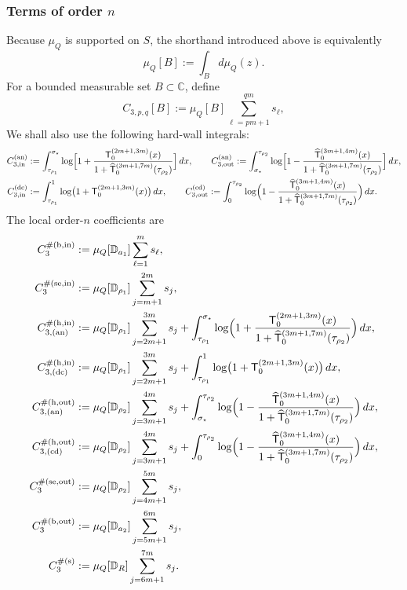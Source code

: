 \documentclass[a4paper]{article}
\newcommand{\C}{\mathbb{C}}
\numberwithin{equation}{section}
\begin{document}
\subsubsection{Terms of order \texorpdfstring{$n$}{n}}
Because $\mu_Q$ is supported on $S$, the shorthand introduced above is
equivalently
\begin{equation}
 \mu_{Q}[B]:=\int_{B}d\mu_{Q}(z).   
\end{equation}
For a bounded measurable set $B\subset\C$, define
\begin{equation}
C_{3,p,q}[B]:=\mu_Q[B]\sum_{\ell=pm+1}^{qm}s_{\ell},    
\end{equation}
We shall also use the following hard-wall integrals:
\begin{align}
C_{3,\mathrm{in}}^{(\mathrm{an})}&:=\int_{\tau_{\rho_1}}^{\sigma_{\star}}\log\Bigl[1+\frac{\mathsf{T}_{0}^{(2m+1,3m)}(x)}{1+\widehat{\mathsf{T}}_0^{(3m+1,7m)}(\tau_{\rho_2})}\Bigr]\,dx,\qquad    
C_{3,\mathrm{out}}^{(\mathrm{an})}:=\int_{\sigma_{\star}}^{\tau_{\rho_2}}
\log\Bigl[1-\frac{\widehat{\mathsf{T}}_0^{(3m+1,4m)}(x)}{1+\widehat{\mathsf{T}}_0^{(3m+1,7m)}(\tau_{\rho_2})}\Bigr]\,dx,
\\
C_{3,\mathrm{in}}^{(\mathrm{dc})}&:=
\int_{\tau_{\rho_1}}^1
\log\bigl(1+\mathsf{T}_{0}^{(2m+1,3m)}(x)\bigr)\,dx,
\qquad
C_{3,\mathrm{out}}^{(\mathrm{cd})}:=\int_{0}^{\tau_{\rho_2}}
\log\Bigl(1-\frac{\widehat{\mathsf{T}}_0^{(3m+1,4m)}(x)}{1+\widehat{\mathsf{T}}_0^{(3m+1,7m)}(\tau_{\rho_2})}\Bigr)\,dx.
\end{align}
The local order-$n$ coefficients are
\begin{align}
C_3^{\#(\mathrm{b,in})}
&:=\mu_Q[\mathbb{D}_{a_1}]\sum_{\ell=1}^m s_{\ell},
\\
C_{3}^{\#(\mathrm{se,in})}
&:=
\mu_Q[\mathbb{D}_{\rho_1}]\sum_{j=m+1}^{2m}s_j,
\\
C_{3,(\mathrm{an})}^{\#(\mathrm{h,in})}
&:=
\mu_Q[\mathbb{D}_{\rho_1}]\sum_{j=2m+1}^{3m}s_j
+\int_{\tau_{\rho_1}}^{\sigma_{\star}}
\log\Bigl(1+\frac{\mathsf{T}_{0}^{(2m+1,3m)}(x)}{1+\widehat{\mathsf{T}}_0^{(3m+1,7m)}(\tau_{\rho_2})}\Bigr)\,dx,
\\
C_{3,(\mathrm{dc})}^{\#(\mathrm{h,in})}
&:=
\mu_Q[\mathbb{D}_{\rho_1}]\sum_{j=2m+1}^{3m}s_j
+
\int_{\tau_{\rho_1}}^1
\log\bigl(1+\mathsf{T}_{0}^{(2m+1,3m)}(x)\bigr)\,dx, 
\\
C_{3,(\mathrm{an})}^{\#(\mathrm{h,out})}
&:=
\mu_Q[\mathbb{D}_{\rho_2}]\sum_{j=3m+1}^{4m}s_j
+
\int_{\sigma_{\star}}^{\tau_{\rho_2}}
\log\Bigl(1-\frac{\widehat{\mathsf{T}}_0^{(3m+1,4m)}(x)}{1+\widehat{\mathsf{T}}_0^{(3m+1,7m)}(\tau_{\rho_2})}\Bigr)\,dx,
\\
C_{3,(\mathrm{cd})}^{\#(\mathrm{h,out})}
&:=
\mu_Q[\mathbb{D}_{\rho_2}]\sum_{j=3m+1}^{4m}s_j
+
\int_{0}^{\tau_{\rho_2}}
\log\Bigl(1-\frac{\widehat{\mathsf{T}}_0^{(3m+1,4m)}(x)}{1+\widehat{\mathsf{T}}_0^{(3m+1,7m)}(\tau_{\rho_2})}\Bigr)\,dx,
\\
C_{3}^{\#(\mathrm{se,out})}
&:=
\mu_Q[\mathbb{D}_{\rho_2}]\sum_{j=4m+1}^{5m}s_j,
\\
C_3^{\#(\mathrm{b,out})}
&:=\mu_Q[\mathbb{D}_{a_2}]\sum_{j=5m+1}^{6m}s_j,
\\
C_3^{\#(\mathrm{s})}
&:=\mu_Q[\mathbb{D}_{R}]\sum_{j=6m+1}^{7m}s_j.
\end{align}
\end{document}
